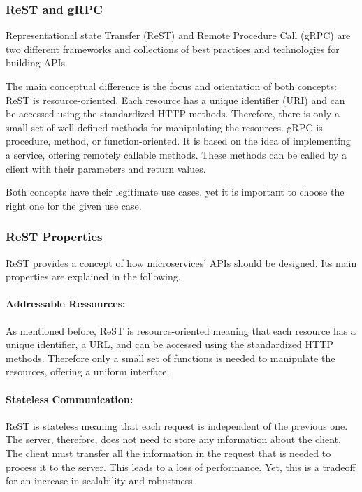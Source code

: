 \subsubsection*{ReST and gRPC}
\label{subsec:rest_and_grpc}
Representational state Transfer (ReST) and Remote Procedure Call (gRPC) are two different frameworks and collections of best practices and technologies for building APIs.

The main conceptual difference is the focus and orientation of both concepts:
ReST is resource-oriented.
Each resource has a unique identifier (URI) and can be accessed using the standardized HTTP methods.
Therefore, there is only a small set of well-defined methods for manipulating the resources.
gRPC is procedure, method, or function-oriented.
It is based on the idea of implementing a service, offering remotely callable methods.
These methods can be called by a client with their parameters and return values.

Both concepts have their legitimate use cases, yet it is important to choose the right one for the given use case.

\subsubsection*{ReST Properties}
ReST provides a concept of how microservices' APIs should be designed.
Its main properties are explained in the following.

\paragraph*{Addressable Ressources:}
As mentioned before, ReST is resource-oriented meaning that each resource has a unique identifier, a URL, and can be accessed using the standardized HTTP methods.
Therefore only a small set of functions is needed to manipulate the resources, offering a uniform interface.

\paragraph*{Stateless Communication:}
ReST is stateless meaning that each request is independent of the previous one.
The server, therefore, does not need to store any information about the client.
The client must transfer all the information in the request that is needed to process it to the server.
This leads to a loss of performance.
Yet, this is a tradeoff for an increase in scalability and robustness.

